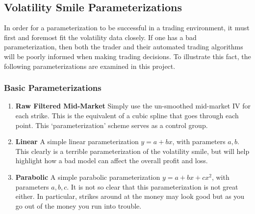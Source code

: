 \documentclass[12pt, a4paper, notitlepage]{article}
\numberwithin{equation}{subsection}
\numberwithin{figure}{subsection}
\numberwithin{table}{subsection}
\begin{document}
\subsection{Volatility Smile Parameterizations}\label{sec:VolSmileParameterizations}
In order for a parameterization to be successful in a trading environment, it must first and foremost fit the volatility data closely.  If one has a bad parameterization, then both the trader and their automated trading algorithms will be poorly informed when making trading decisions.  To illustrate this fact, the following parameterizations are examined in this project.

\subsubsection{Basic Parameterizations}\label{subsec:BasicParameterizations}
\begin{enumerate}
	\item \textbf{Raw Filtered Mid-Market}
    \newline Simply use the un-smoothed mid-market IV for each strike.  This is the equivalent of a cubic spline that goes through each point.  This `parameterization' scheme serves as a control group.
    \item \textbf{Linear} 
    \newline A simple linear parameterization $y = a + bx$, with parameters $a,b$.  This clearly is a terrible parameterization of the volatility smile, but will help highlight how a bad model can affect the overall profit and loss.
    \item \textbf{Parabolic}
    \newline A simple parabolic parameterization $y = a + bx + cx^2$, with parameters $a,b,c$.  It is not so clear that this parameterization is not great either.  In particular, strikes around at the money may look good but as you go out of the money you run into trouble.
\end{enumerate}
\end{document}

